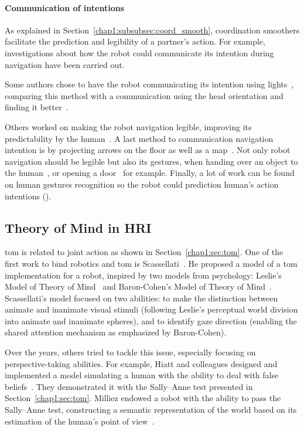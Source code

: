 \documentclass[a4paper,11pt,twoside]{StyleThese}
\begin{document}
\paragraph{Communication of intentions} As explained in Section~\ref{chap1:subsubsec:coord_smooth}, coordination smoothers facilitate the prediction and legibility of a partner's action. For example, investigations about how the robot could communicate its intention during navigation have been carried out. 

Some authors chose to have the robot communicating its intention using lights~\cite{szafir_2015_communicating}, comparing this method with a communication using the head orientation and finding it better~\cite{may_2015_show}. 

Others worked on making the robot navigation legible, improving its predictability by the human~\cite{dragan_2013_legibility, alami_2006_toward,khambhaita_2016_head}. A last method to communication navigation intention is by projecting arrows on the floor as well as a map~\cite{chadalavada_2015_mind, coovert_2014_spatial}.  Not only robot navigation should be legible but also its gestures, when handing over an object to the human~\cite{sisbot_2012_human}, or opening a door~\cite{takayama_2011_expressing} for example. Finally, a lot of work can be found on human gestures recognition so the robot could prediction human's action intentions (\eg\cite{barros_2017_dynamic, chang_2018_effects}).

\subsection{Theory of Mind in HRI}\label{chap2:subsec:tom_hri}
\acrfull{tom} is related to joint action as shown in Section~\ref{chap1:sec:tom}. One of the first work to bind robotics and \acrshort{tom} is Scassellati~\cite{scassellati_2002_theory}. He proposed a model of a \acrshort{tom} implementation for a robot, inspired by two models from psychology: Leslie’s Model of Theory of Mind~\cite{leslie_1984_spatiotemporal} and Baron-Cohen’s Model of Theory of Mind~\cite{baron-cohen_1995_mindblindness}. Scassellati's model focused on two abilities: to make the distinction between animate and inanimate visual stimuli (following Leslie's perceptual world division into animate and inanimate spheres), and to identify gaze direction (enabling the shared attention mechanism as emphasized by Baron-Cohen). 

Over the years, others tried to tackle this issue, especially focusing on perspective-taking abilities. For example, Hiatt and colleagues designed and implemented a model simulating a human with the ability to deal with false beliefs~\cite{hiatt_2010_cognitive}. They demonstrated it with the Sally--Anne test presented in Section~\ref{chap1:sec:tom}. Milliez \etal{} endowed a robot with the ability to pass the Sally--Anne test, constructing a semantic representation of the world based on its estimation of the human's point of view~\cite{milliez_2014_framework}.
\end{document}
